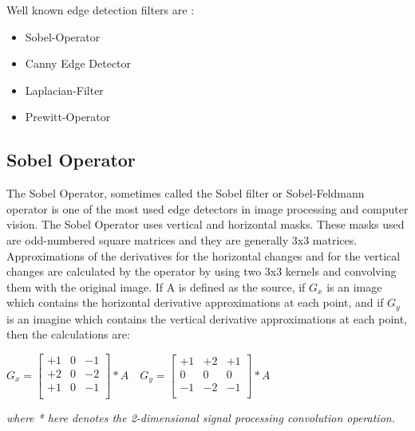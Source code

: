 Well known edge detection filters are :

\begin{itemize}

 \item Sobel-Operator
 \item Canny Edge Detector
 \item Laplacian-Filter
 \item Prewitt-Operator
 
 \end{itemize}


%
\subsection{Sobel Operator}\label{sec:Sobel Operator}

The Sobel Operator, sometimes called the Sobel filter or Sobel-Feldmann operator is one of the most used edge detectors in image processing and computer vision. The Sobel Operator uses vertical and horizontal masks. These masks used are odd-numbered square matrices and they are generally 3x3 matrices. Approximations of the derivatives for the horizontal changes and for the vertical changes are calculated by the operator by using two 3x3 kernels and convolving them with the original image. If A is defined as the source, if $G_{x}$ is an image which contains the horizontal derivative approximations at each point, and if $G_{y}$ is an imagine which contains the vertical derivative approximations at each point, then the calculations are\cite{SobelOperatorandCannyEdgeDetector}:

\begin{center}

$  G_{x} = 
  \begin{bmatrix}
	+1 & 0 & -1 \\
	+2 & 0 & -2 \\
	+1 & 0 & -1 \\
   \end{bmatrix} * A  \quad
  G_{y} = 
  \begin{bmatrix}
	+1 & +2 & +1 \\
	0 & 0 & 0 \\
	-1 & -2 & -1 \\
  \end{bmatrix} * A		$

\end{center}

\emph{\color{blue}where * here denotes the 2-dimensional signal processing convolution operation.}


